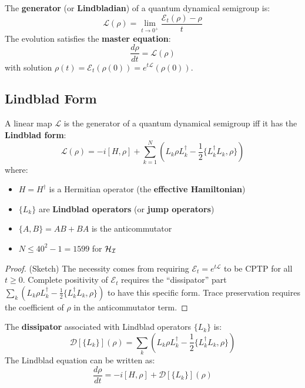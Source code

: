 \begin{definition}
\label{def:generator}
The \textbf{generator} (or \textbf{Lindbladian}) of a quantum dynamical semigroup is:
\[
\mathcal{L}(\rho) = \lim_{t \to 0^+} \frac{\mathcal{E}_t(\rho) - \rho}{t}
\]
The evolution satisfies the \textbf{master equation}:
\[
\frac{d\rho}{dt} = \mathcal{L}(\rho)
\]
with solution $\rho(t) = \mathcal{E}_t(\rho(0)) = e^{t\mathcal{L}}(\rho(0))$.
\end{definition}

\subsection{Lindblad Form}

\begin{theorem}
\label{thm:lindblad}
A linear map $\mathcal{L}$ is the generator of a quantum dynamical semigroup iff it has the \textbf{Lindblad form}:
\[
\mathcal{L}(\rho) = -i[H, \rho] + \sum_{k=1}^{N} \left( L_k \rho L_k^\dagger - \frac{1}{2}\{L_k^\dagger L_k, \rho\} \right)
\]
where:
\begin{itemize}
  \item $H = H^\dagger$ is a Hermitian operator (the \textbf{effective Hamiltonian})
  \item $\{L_k\}$ are \textbf{Lindblad operators} (or \textbf{jump operators})
  \item $\{A, B\} = AB + BA$ is the anticommutator
  \item $N \leq 40^2 - 1 = 1599$ for $\mathcal{H}_{\mathcal{I}}$
\end{itemize}
\end{theorem}

\begin{proof}
(Sketch) The necessity comes from requiring $\mathcal{E}_t = e^{t\mathcal{L}}$ to be CPTP for all $t \geq 0$. Complete positivity of $\mathcal{E}_t$ requires the ``dissipator'' part $\sum_k (L_k \rho L_k^\dagger - \frac{1}{2}\{L_k^\dagger L_k, \rho\})$ to have this specific form. Trace preservation requires the coefficient of $\rho$ in the anticommutator term.
\end{proof}

\begin{definition}[Dissipator]
\label{def:dissipator}
The \textbf{dissipator} associated with Lindblad operators $\{L_k\}$ is:
\[
\mathcal{D}[\{L_k\}](\rho) = \sum_k \left( L_k \rho L_k^\dagger - \frac{1}{2}\{L_k^\dagger L_k, \rho\} \right)
\]
The Lindblad equation can be written as:
\[
\frac{d\rho}{dt} = -i[H, \rho] + \mathcal{D}[\{L_k\}](\rho)
\]
\end{definition}

